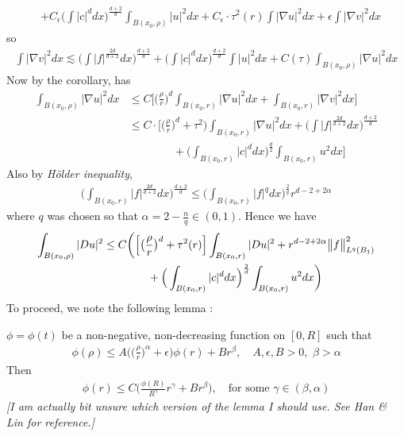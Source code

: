 \documentclass[12pt,a4paper]{article}
\newenvironment{proof}
{\begin{changemargin}{0.5cm}{0.5cm} 
	}%
	{\end{changemargin}
}
\newenvironment{subproof}
{\begin{changemargin}{0.5cm}{0.5cm} 
	}%
	{\end{changemargin}
}
\newenvironment{p}
{\begin{proof} 
	}%
	{\end{proof}
}
\begin{document}
\begin{p}
\begin{align*}
& + C_{\epsilon} \Big( \int |c|^d dx \Big)^{\frac{d+2}{d}} \int_{B(x_0, \rho)} |u|^2 dx + C_{\epsilon}\cdot \tau^2(r) \int |\nabla u|^2 dx + \epsilon \int |\nabla v|^2 dx 
\end{align*}
so
\begin{align*}
\int |\nabla v|^2 dx \lesssim \Big( \int |f|^{\frac{2d}{d+2}} dx\Big)^{\frac{d+2}{d}} + \Big( \int |c|^d dx \Big)^{\frac{d+2}{d}} \int |u|^2 dx + C(\tau)\int_{B(x_0, \rho)} |\nabla u|^2 dx 
\end{align*}
Now by the corollary, has 
\begin{align*}
\int_{B(x_0, \rho)} |\nabla u|^2 dx &\leq C \Big[ \Big( \frac{\rho}{r} \Big)^d \int_{B(x_0, r)} |\nabla u|^2 dx + \int_{B(x_0, r)} |\nabla v|^2 dx \Big] \\
& \leq C \cdot \Big[ \Big( \frac{\rho}{r} \Big)^d + \tau^2 \Big) \int_{B(x_0, r)} |\nabla u|^2 dx + \Big( \int |f|^{\frac{2d}{d+2}} dx\Big)^{\frac{d+2}{d}} \\
& \quad \quad\quad\quad + \Big( \int_{B(x_0, r)} |c|^d dx \Big)^{\frac{d}{2}} \int_{B(x_0, r)} u^2 dx \Big]
\end{align*}
Also by \emph{H\"older inequality},
\begin{align*}
\Big( \int_{B(x_0, r)} |f|^{\frac{2d}{d+2}} dx\Big)^{\frac{d+2}{d}} \leq \Big( \int_{B(x_0, r)} |f|^{q}dx \Big)^{\frac{2}{q}} r^{d-2 + 2\alpha}
\end{align*}
where $q$ was chosen so that $\alpha = 2- \frac{n}{q} \in (0,1)$. Hence we have
\begin{align*}
\int_{B(x_0, \rho)} |Du|^2 & \leq C \bigg( \Big[ \big(\frac{\rho}{r} \big)^d + \tau^2(r) \Big] \int_{B(x_0,r)} |Du|^2 + r^{d-2+2\alpha} \bigl\lVert f\bigr\rVert_{L^q(B_1)}^2 \\
& \quad\quad\quad\quad + \Big( \int_{B(x_0, r)} |c|^d dx\Big)^{\frac{2}{d}}\int_{B(x_0, r)} u^2 dx \bigg)
\end{align*}
To proceed, we note the following lemma :
\begin{subproof}
\lem $\phi =\phi(t)$ be a non-negative, non-decreasing function on $[0, R]$ such that
\begin{align*}
\phi(\rho) \leq A \Big( \big( \frac{\rho}{r}\big)^{\alpha} + \epsilon \Big) \phi(r) + Br^{\beta}, \quad A, \epsilon, B>0, \,\, \beta >\alpha
\end{align*}
Then 
\begin{align*}
\phi(r) \leq C \Big( \frac{\phi(R)}{R^{\gamma}}r^{\gamma} + Br^{\beta} \Big), \quad \text{for some } \gamma \in (\beta , \alpha)
\end{align*}
\emph{[I am actually bit unsure which version of the lemma I should use. See Han \& Lin for reference.]}


\end{subproof}
\end{p}
\end{document}
